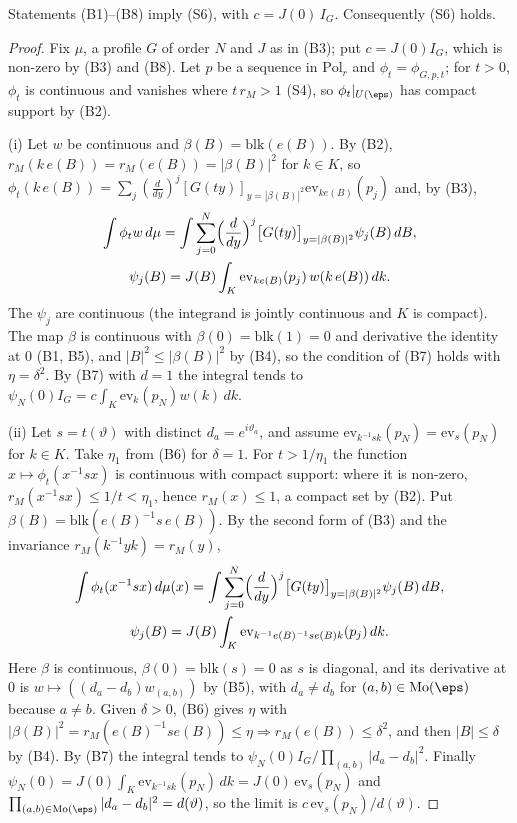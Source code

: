 \begin{proposition}\label{pf:multnc:stlim}
Statements (B1)--(B8) imply (S6), with $c=J(0)\,I_G$. Consequently (S6) holds.
\end{proposition}

\begin{proof}
Fix $\mu$, a profile $G$ of order $N$ and $J$ as in (B3); put $c=J(0)I_G$, which is non-zero by (B3) and (B8). Let $p$ be
a sequence in $\mathrm{Pol}_r$ and $\phi_t=\phi_{G,p,t}$; for $t>0$, $\phi_t$ is continuous and vanishes where
$t\,r_M>1$ (S4), so $\phi_t|_{U(\eps)}$ has compact support by (B2).

(i) Let $w$ be continuous and $\beta(B)=\mathrm{blk}(e(B))$. By (B2), $r_M(k\,e(B))=r_M(e(B))=|\beta(B)|^2$ for $k\in K$,
so $\phi_t(k\,e(B))=\sum_j(\frac d{dy})^j[G(ty)]_{y=|\beta(B)|^2}\mathrm{ev}_{k e(B)}(p_j)$ and, by (B3),
\begin{gather*}
\int\phi_tw\,d\mu=\int\sum_{j=0}^N\Bigl(\frac d{dy}\Bigr)^j\bigl[G(ty)\bigr]_{y=|\beta(B)|^2}\psi_j(B)\,dB,\\
\psi_j(B)=J(B)\int_K\mathrm{ev}_{k e(B)}(p_j)\,w(k\,e(B))\,dk .
\end{gather*}
The $\psi_j$ are continuous (the integrand is jointly continuous and $K$ is compact). The map $\beta$ is continuous with
$\beta(0)=\mathrm{blk}(1)=0$ and derivative the identity at $0$ (B1, B5), and $|B|^2\le|\beta(B)|^2$ by (B4), so the
condition of (B7) holds with $\eta=\delta^2$. By (B7) with $d=1$ the integral tends to $\psi_N(0)I_G=c\int_K
\mathrm{ev}_k(p_N)w(k)\,dk$.

(ii) Let $s=t(\vartheta)$ with distinct $d_a=e^{i\vartheta_a}$, and assume $\mathrm{ev}_{k^{-1}sk}(p_N)=\mathrm{ev}_s(p_N)$
for $k\in K$. Take $\eta_1$ from (B6) for $\delta=1$. For $t>1/\eta_1$ the function $x\mapsto\phi_t(x^{-1}sx)$ is continuous
with compact support: where it is non-zero, $r_M(x^{-1}sx)\le1/t<\eta_1$, hence $r_M(x)\le1$, a compact set by (B2). Put
$\beta(B)=\mathrm{blk}(e(B)^{-1}s\,e(B))$. By the second form of (B3) and the invariance $r_M(k^{-1}yk)=r_M(y)$,
\begin{gather*}
\int\phi_t(x^{-1}sx)\,d\mu(x)=\int\sum_{j=0}^N\Bigl(\frac d{dy}\Bigr)^j\bigl[G(ty)\bigr]_{y=|\beta(B)|^2}\psi_j(B)\,dB,\\
\psi_j(B)=J(B)\int_K\mathrm{ev}_{k^{-1}e(B)^{-1}se(B)k}(p_j)\,dk .
\end{gather*}
Here $\beta$ is continuous, $\beta(0)=\mathrm{blk}(s)=0$ as $s$ is diagonal, and its derivative at $0$ is
$w\mapsto((d_a-d_b)w_{(a,b)})$ by (B5), with $d_a\ne d_b$ for $(a,b)\in\mathrm{Mo}(\eps)$ because $a\ne b$. Given
$\delta>0$, (B6) gives $\eta$ with $|\beta(B)|^2=r_M(e(B)^{-1}se(B))\le\eta\Rightarrow r_M(e(B))\le\delta^2$, and then
$|B|\le\delta$ by (B4). By (B7) the integral tends to $\psi_N(0)I_G/\prod_{(a,b)}|d_a-d_b|^2$. Finally
$\psi_N(0)=J(0)\int_K\mathrm{ev}_{k^{-1}sk}(p_N)\,dk=J(0)\,\mathrm{ev}_s(p_N)$ and $\prod_{(a,b)\in\mathrm{Mo}(\eps)}
|d_a-d_b|^2=d(\vartheta)$, so the limit is $c\,\mathrm{ev}_s(p_N)/d(\vartheta)$.
\end{proof}

